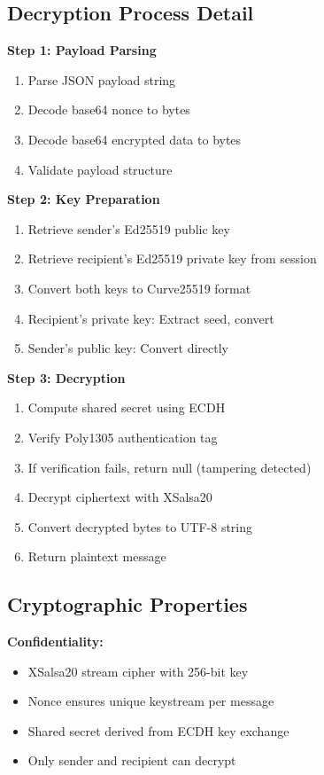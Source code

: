 \subsection{Decryption Process Detail}

\textbf{Step 1: Payload Parsing}
\begin{enumerate}
    \item Parse JSON payload string
    \item Decode base64 nonce to bytes
    \item Decode base64 encrypted data to bytes
    \item Validate payload structure
\end{enumerate}

\textbf{Step 2: Key Preparation}
\begin{enumerate}
    \item Retrieve sender's Ed25519 public key
    \item Retrieve recipient's Ed25519 private key from session
    \item Convert both keys to Curve25519 format
    \item Recipient's private key: Extract seed, convert
    \item Sender's public key: Convert directly
\end{enumerate}

\textbf{Step 3: Decryption}
\begin{enumerate}
    \item Compute shared secret using ECDH
    \item Verify Poly1305 authentication tag
    \item If verification fails, return null (tampering detected)
    \item Decrypt ciphertext with XSalsa20
    \item Convert decrypted bytes to UTF-8 string
    \item Return plaintext message
\end{enumerate}

\subsection{Cryptographic Properties}

\textbf{Confidentiality:}
\begin{itemize}
    \item XSalsa20 stream cipher with 256-bit key
    \item Nonce ensures unique keystream per message
    \item Shared secret derived from ECDH key exchange
    \item Only sender and recipient can decrypt
\end{itemize}

